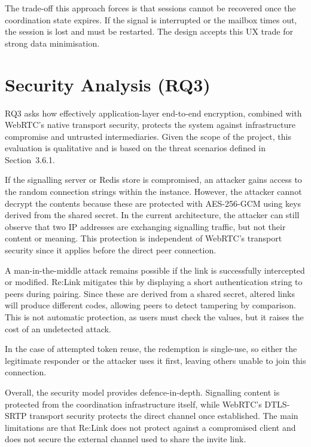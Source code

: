 \documentclass[12pt,a4paper,oneside]{report}
\begin{document}
The trade-off this approach forces is that sessions cannot be recovered once the coordination state expires. If the signal is interrupted or the mailbox times out, the session is lost and must be restarted. The design accepts this UX trade for strong data minimisation.


\section{Security Analysis (RQ3)}
\label{sec:rq3}

RQ3 asks how effectively application-layer end-to-end encryption, combined with WebRTC's native transport security, protects the system against infrastructure compromise and untrusted intermediaries. Given the scope of the project, this evaluation is qualitative and is based on the threat scenarios defined in Section~3.6.1.

If the signalling server or Redis store is compromised, an attacker gains access to the random connection strings within the instance. However, the attacker cannot decrypt the contents because these are protected with AES-256-GCM using keys derived from the shared secret. In the current architecture, the attacker can still observe that two IP addresses are exchanging signalling traffic, but not their content or meaning. This protection is independent of WebRTC's transport security since it applies before the direct peer connection.

A man-in-the-middle attack remains possible if the link is successfully intercepted or modified. Re:Link mitigates this by displaying a short authentication string to peers during pairing. Since these are derived from a shared secret, altered links will produce different codes, allowing peers to detect tampering by comparison. This is not automatic protection, as users must check the values, but it raises the cost of an undetected attack.

In the case of attempted token reuse, the redemption is single-use, so either the legitimate responder or the attacker uses it first, leaving others unable to join this connection.

Overall, the security model provides defence-in-depth. Signalling content is protected from the coordination infrastructure itself, while WebRTC's DTLS-SRTP transport security protects the direct channel once established. The main limitations are that Re:Link does not protect against a compromised client and does not secure the external channel used to share the invite link.
\end{document}
